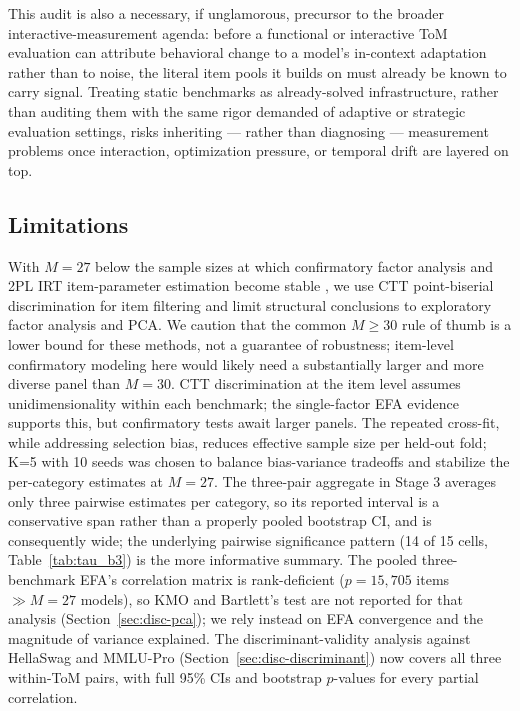 \documentclass{article} %
\begin{document}
This audit is also a necessary, if unglamorous, precursor to the broader interactive-measurement agenda: before a functional or interactive ToM evaluation can attribute behavioral change to a model's in-context adaptation rather than to noise, the literal item pools it builds on must already be known to carry signal. Treating static benchmarks as already-solved infrastructure, rather than auditing them with the same rigor demanded of adaptive or strategic evaluation settings, risks inheriting --- rather than diagnosing --- measurement problems once interaction, optimization pressure, or temporal drift are layered on top.
 
\subsection{Limitations}
\label{sec:limitations}
 
With $M=27$ below the sample sizes at which confirmatory factor
analysis and 2PL IRT item-parameter estimation become stable
\citep{konig2020optimized, fujimoto2020bayesian}, we use CTT
point-biserial discrimination for item filtering and limit structural
conclusions to exploratory factor analysis and PCA. We caution that the
common $M\ge 30$ rule of thumb is a lower bound for these methods, not a
guarantee of robustness; item-level confirmatory modeling here would
likely need a substantially larger and more diverse panel than $M=30$.
CTT discrimination at the item level assumes unidimensionality within
each benchmark; the single-factor EFA evidence supports this, but
confirmatory tests await larger panels.
The repeated cross-fit, while addressing selection bias,
reduces effective sample size per held-out fold; K=5 with 10 seeds was
chosen to balance bias-variance tradeoffs and stabilize the
per-category estimates at $M=27$.
The three-pair aggregate in Stage 3 averages only three pairwise estimates per category, so its reported interval is a conservative span rather than a properly pooled bootstrap CI, and is consequently wide; the underlying pairwise significance pattern (14 of 15 cells, Table~\ref{tab:tau_b3}) is the more informative summary. The pooled three-benchmark EFA's correlation matrix is rank-deficient ($p=15{,}705$ items $\gg M=27$ models), so KMO and Bartlett's test are not reported for that analysis (Section~\ref{sec:disc-pca}); we rely instead on EFA convergence and the magnitude of variance explained. The discriminant-validity analysis against HellaSwag and MMLU-Pro (Section~\ref{sec:disc-discriminant}) now covers all three within-ToM pairs, with full 95\% CIs and bootstrap $p$-values for every partial correlation.
 
\end{document}
